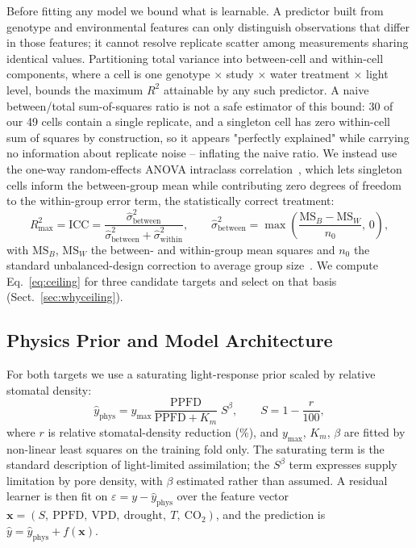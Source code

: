 \documentclass[runningheads]{llncs}
\begin{document}
Before fitting any model we bound what is learnable. A predictor built from genotype and environmental features can only distinguish observations that differ in those features; it cannot resolve replicate scatter among measurements sharing identical values. Partitioning total variance into between-cell and within-cell components, where a cell is one genotype $\times$ study $\times$ water treatment $\times$ light level, bounds the maximum $R^{2}$ attainable by any such predictor. A naive between/total sum-of-squares ratio is not a safe estimator of this bound: 30 of our 49 cells contain a single replicate, and a singleton cell has zero within-cell sum of squares by construction, so it appears "perfectly explained" while carrying no information about replicate noise -- inflating the naive ratio. We instead use the one-way random-effects ANOVA intraclass correlation~\cite{ref_searle}, which lets singleton cells inform the between-group mean while contributing zero degrees of freedom to the within-group error term, the statistically correct treatment:
\begin{equation}\label{eq:ceiling}
R^{2}_{\max} = \mathrm{ICC} = \frac{\hat{\sigma}^{2}_{\text{between}}}{\hat{\sigma}^{2}_{\text{between}} + \hat{\sigma}^{2}_{\text{within}}},
\qquad
\hat{\sigma}^{2}_{\text{between}} = \max\!\left(\frac{\mathrm{MS}_{B}-\mathrm{MS}_{W}}{n_0},\,0\right),
\end{equation}
with $\mathrm{MS}_B$, $\mathrm{MS}_W$ the between- and within-group mean squares and $n_0$ the standard unbalanced-design correction to average group size~\cite{ref_searle}. We compute Eq.~\ref{eq:ceiling} for three candidate targets and select on that basis (Sect.~\ref{sec:whyceiling}).

\subsection{Physics Prior and Model Architecture}\label{sec:model}

For both targets we use a saturating light-response prior scaled by relative stomatal density:
\begin{equation}\label{eq:phys}
\hat{y}_{\text{phys}} = y_{\max}\,\frac{\mathrm{PPFD}}{\mathrm{PPFD}+K_m}\;S^{\beta},
\qquad S = 1 - \frac{r}{100},
\end{equation}
where $r$ is relative stomatal-density reduction (\%), and $y_{\max}$, $K_m$, $\beta$ are fitted by non-linear least squares on the training fold only. The saturating term is the standard description of light-limited assimilation; the $S^{\beta}$ term expresses supply limitation by pore density, with $\beta$ estimated rather than assumed. A residual learner is then fit on $\varepsilon = y - \hat{y}_{\text{phys}}$ over the feature vector $\mathbf{x} = (S,\ \mathrm{PPFD},\ \mathrm{VPD},\ \mathrm{drought},\ T,\ \mathrm{CO}_2)$, and the prediction is $\hat{y} = \hat{y}_{\text{phys}} + f(\mathbf{x})$.
\end{document}
